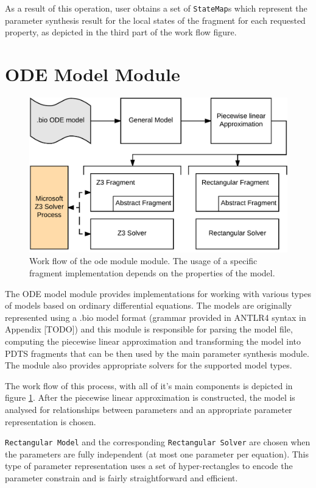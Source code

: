As a result of this operation, user obtains a set of \texttt{StateMap}s which represent the parameter synthesis result for the local states of the fragment for each requested property, as depicted in the third part of the work flow figure.

\section{ODE Model Module}


\begin{figure}[]
	\centering
	\includegraphics[scale=0.45]{media/ode_workflow.pdf}
	\caption{Work flow of the ode module module. The usage of a specific fragment implementation depends on the properties of the model. }
	\label{fig:ode_workflow}
\end{figure}

The ODE model module provides implementations for working with various types of models based on ordinary differential equations. The models are originally represented using a .bio model format (grammar provided in ANTLR4 syntax in Appendix [TODO]) and this module is responsible for parsing the model file, computing the piecewise linear approximation and transforming the model into \ac{PDTS} fragments that can be then used by the main parameter synthesis module. The module also provides appropriate solvers for the supported model types.	

The work flow of this process, with all of it's main components is depicted in figure \ref{fig:ode_workflow}. After the piecewise linear approximation is constructed, the model is analysed for relationships between parameters and an appropriate parameter representation is chosen.

\texttt{Rectangular Model} and the corresponding \texttt{Rectangular Solver} are chosen when the parameters are fully independent (at most one parameter per equation). This type of parameter representation uses a set of hyper-rectangles to encode the parameter constrain and is fairly straightforward and efficient.

